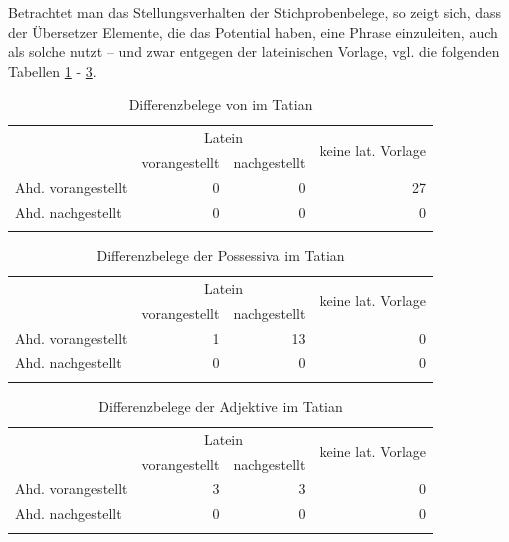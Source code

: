 Betrachtet man das Stellungsverhalten der Stichprobenbelege, so zeigt sich, dass der Übersetzer Elemente, die das Potential haben, eine Phrase einzuleiten, auch als solche nutzt -- und zwar entgegen der lateinischen Vorlage, vgl. die folgenden Tabellen \ref{tab:diff-ther-tatian} - \ref{tab:diff-adj-tatian}.  

\begin{table}
\centering
\begin{tabular}{lrrr}
\lsptoprule
& \multicolumn{2}{c}{Latein} & \multirow{2}{*}{keine lat. Vorlage}\\
 \cmidrule(lr){2-3}
                   & vorangestellt & nachgestellt & \\ \midrule
Ahd. vorangestellt & 0                  & 0                 & 27                    \\
Ahd. nachgestellt  & 0                  & 0                 & 0                    \\ \lspbottomrule
\end{tabular}
\caption{Differenzbelege von  im Tatian}
\label{tab:diff-ther-tatian}
\end{table}

\begin{table}
\centering
\begin{tabular}{lrrr}
\lsptoprule
                   & \multicolumn{2}{c}{Latein} & \multirow{2}{*}{keine lat. Vorlage}\\
 \cmidrule(lr){2-3}
                   & vorangestellt & nachgestellt & \\ \midrule
Ahd. vorangestellt & 1                  & 13                 & 0                    \\
Ahd. nachgestellt  & 0                  & 0                 & 0                    \\ \lspbottomrule
\end{tabular}
\caption{Differenzbelege der Possessiva im Tatian}
\label{tab:diff-poss-tatian}
\end{table}

\begin{table}
\centering
\begin{tabular}{lrrr}
\lsptoprule
                   & \multicolumn{2}{c}{Latein} & \multirow{2}{*}{keine lat. Vorlage}\\
 \cmidrule(lr){2-3}
                   & vorangestellt & nachgestellt & \\ \midrule
Ahd. vorangestellt & 3                  & 3                & 0                    \\
Ahd. nachgestellt  & 0                  & 0                 & 0                    \\ \lspbottomrule
\end{tabular}
\caption{Differenzbelege der Adjektive im Tatian}
\label{tab:diff-adj-tatian}
\end{table}


